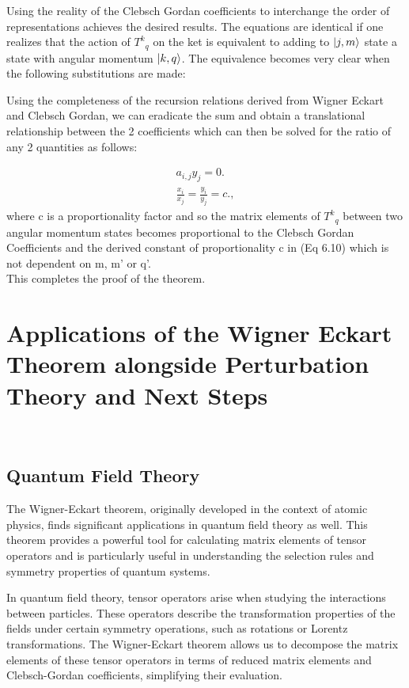 \documentclass[a4paper,11pt]{article}
\DeclarePairedDelimiter\ket{\lvert}{\rangle}
\begin{document}
Using the reality of the Clebsch Gordan coefficients to interchange the order of representations achieves the desired results. The equations are identical if one realizes that the action of ${T^k}_q$ on the ket is equivalent to adding to $\ket{j,m}$ state a state with angular momentum $\ket{k,q}$. The equivalence becomes very clear when the following substitutions are made:


Using the completeness of the recursion relations derived from Wigner Eckart and Clebsch Gordan, we can eradicate the sum and obtain a translational relationship between the 2 coefficients which can then be solved for the ratio of any 2 quantities as follows:

\begin{equation}
\label{eq:Coefficients ratio}
\begin{aligned}
   a_{i,j} y_j = 0.
    \\
    \frac{x_i}{x_j} = \frac{y_i}{y_j} = c.,
\end{aligned}
\end{equation}
where c is a proportionality factor and so the matrix elements of ${T^k}_q$ between two angular momentum states becomes proportional to the Clebsch Gordan Coefficients and the derived constant of proportionality c in (Eq 6.10) which is not dependent on m, m' or q'.
\\
This completes the proof of the theorem.

\section{Applications of the Wigner Eckart Theorem alongside Perturbation Theory and Next Steps}
\\
\subsection{Quantum Field Theory}
The Wigner-Eckart theorem, originally developed in the context of atomic physics, finds significant applications in quantum field theory as well. This theorem provides a powerful tool for calculating matrix elements of tensor operators and is particularly useful in understanding the selection rules and symmetry properties of quantum systems.


In quantum field theory, tensor operators arise when studying the interactions between particles. These operators describe the transformation properties of the fields under certain symmetry operations, such as rotations or Lorentz transformations. The Wigner-Eckart theorem allows us to decompose the matrix elements of these tensor operators in terms of reduced matrix elements and Clebsch-Gordan coefficients, simplifying their evaluation.
\end{document}
